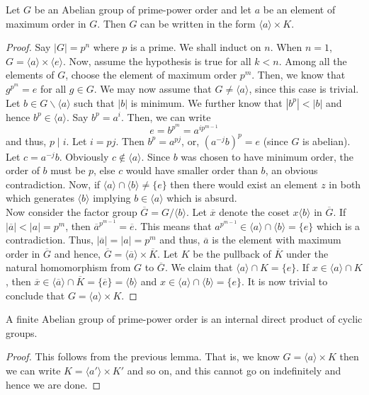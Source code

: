 \begin{lemma}
	Let $G$ be an Abelian group of prime-power order and let $a$ be an element of maximum order in $G$. Then $G$ can be written in the form $\langle a\rangle\times K$.
\end{lemma}
\begin{proof}
	Say $|G|=p^n$ where $p$ is a prime. We shall induct on $n$. When $n=1$, $G=\langle a\rangle\times\langle e\rangle$. Now, assume the hypothesis is true for all $k<n$. Among all the elements of $G$, choose the element of maximum order $p^m$. Then, we know that $g^{p^m}=e$ for all $g\in G$. We may now assume that $G\ne\langle a\rangle$, since this case is trivial. Let $b\in G\backslash\langle a\rangle$ such that $|b|$ is minimum. We further know that $|b^p|<|b|$ and hence $b^p\in\langle a\rangle$. Say $b^p=a^i$. Then, we can write 
	$$
	e=b^{p^{m}}=a^{ip^{m-1}}
	$$
	and thus, $p\mid i$. Let $i=pj$. Then $b^p=a^{pj}$, or, $(a^{-j}b)^p=e$ (since $G$ is abelian). Let $c=a^{-j}b$. Obviously $c\notin\langle a\rangle$. Since $b$ was chosen to have minimum order, the order of $b$ must be $p$, else $c$ would have smaller order than $b$, an obvious contradiction. Now, if $\langle a\rangle\cap\langle b\rangle\ne\{e\}$ then there would exist an element $z$ in both which generates $\langle b\rangle$ implying $b\in\langle a\rangle$ which is absurd.\\
	Now consider the factor group $\overline{G}=G/\langle b\rangle$. Let $\overline{x}$ denote the coset $x\langle b\rangle$ in $\overline{G}$. If $|\overline{a}|<|a|=p^m$, then $\overline{a}^{p^{m-1}}=\overline{e}$. This means that $a^{p^{m-1}}\in\langle a\rangle\cap\langle b\rangle=\{e\}$ which is a contradiction. Thus, $|\overline{a}|=|a|=p^m$ and thus, $\overline{a}$ is the element with maximum order in $\overline{G}$ and hence, $\overline{G}=\langle\overline{a}\rangle\times\overline{K}$. Let $K$ be the pullback of $\overline{K}$ under the natural homomorphism from $G$ to $\overline{G}$. We claim that $\langle a\rangle\cap K=\{e\}$. If $x\in\langle a\rangle\cap K$, then $\overline{x}\in\langle\overline{a}\rangle\cap\overline{K}=\{\overline{e}\}=\langle b\rangle$ and $x\in\langle a\rangle\cap\langle b\rangle=\{e\}$. It is now trivial to conclude that $G=\langle a\rangle\times K$. 
\end{proof}

\begin{lemma}
	A finite Abelian group of prime-power order is an internal direct product of cyclic groups.
\end{lemma}
\begin{proof}
	This follows from the previous lemma. That is, we know $G=\langle a\rangle\times K$ then we can write $K=\langle a'\rangle\times K'$ and so on, and this cannot go on indefinitely and hence we are done.
\end{proof}

